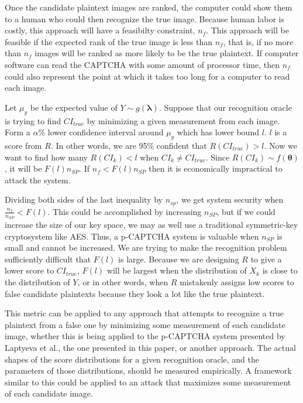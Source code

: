 \documentclass[12pt]{article}
\begin{document}
Once the candidate plaintext images are ranked, the computer could show them to a human who could then recognize the true image. Because human labor is costly, this approach will have a feasibilty constraint, $n_f$. This approach will be feasible if the expected rank of the true image is less than $n_f$, that is, if no more than $n_f$ images will be ranked as more likely to be the true plaintext. If computer software can read the CAPTCHA with some amount of processor time, then $n_f$ could also represent the point at which it takes too long for a computer to read each image.

Let $\mu_y$ be the expected value of $Y \sim g(\mathbf{\lambda})$. Suppose that our recognition oracle is trying to find $CI_{true}$ by minimizing a given measurement from each image. Form a $\alpha\%$ lower confidence interval around $\mu_y$ which has lower bound $l$. $l$ is a score from $R$. In other words, we are 95\% confident that $R(CI_{true}) > l$. Now we want to find how many $R(CI_k) < l$ when $CI_k \neq CI_{true}$. Since $R\left(CI_k\right) \sim f(\mathbf{\theta})$, it will be $F(l) n_{SP}$. If $n_f < F(l) n_{SP}$ then it is economically impractical to attack the system.

Dividing both sides of the last inequality by $n_{sp}$, we get system security when $\frac{n_f}{n_{SP}} < F(l)$. This could be accomplished by increasing $n_{SP}$, but if we could increase the size of our key space, we may as well use a traditional symmetric-key cryptosystem like AES. Thus, a p-CAPTCHA system is valuable when $n_{SP}$ is small and cannot be increased. We are trying to make the recognition problem sufficiently difficult that $F(l)$ is large. Because we are designing $R$ to give a lower score to $CI_{true}$, $F(l)$ will be largest when the distribution of $X_k$ is close to the distribution of $Y$, or in other words, when $R$ mistakenly assigns low scores to false candidate plaintexts because they look a lot like the true plaintext.

This metric can be applied to any approach that attempts to recognize a true plaintext from a false one by minimizing some measurement of each candidate image, whether this is being applied to the p-CAPTCHA system presented by Laptyeva et al., the one presented in this paper, or another approach. The actual shapes of the score distributions for a given recognition oracle, and the parameters of those distributions, should be measured empirically. A framework similar to this could be applied to an attack that maximizes some measurement of each candidate image.
\end{document}
